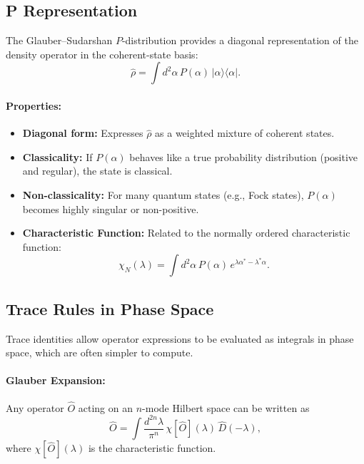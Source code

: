 \subsection{P Representation}

The Glauber--Sudarshan $P$-distribution provides a diagonal representation of the density operator in the coherent-state basis:
\begin{equation}
\hat{\rho} = \int d^2\alpha \, P(\alpha)\, |\alpha\rangle \langle \alpha|.
\end{equation}

\paragraph{Properties:}
\begin{itemize}
    \item \textbf{Diagonal form:} Expresses $\hat{\rho}$ as a weighted mixture of coherent states.
    \item \textbf{Classicality:} If $P(\alpha)$ behaves like a true probability distribution (positive and regular), the state is classical.
    \item \textbf{Non-classicality:} For many quantum states (e.g., Fock states), $P(\alpha)$ becomes highly singular or non-positive.
    \item \textbf{Characteristic Function:} Related to the normally ordered characteristic function:
    \begin{equation}
    \chi_N(\lambda) = \int d^2\alpha \, P(\alpha)\, e^{\lambda \alpha^* - \lambda^* \alpha}.
    \end{equation}
\end{itemize}


\subsection{Trace Rules in Phase Space}

Trace identities allow operator expressions to be evaluated as integrals in phase space, which are often simpler to compute.

\paragraph{Glauber Expansion:}
Any operator $\hat{O}$ acting on an $n$-mode Hilbert space can be written as
\begin{equation}
\hat{O} = \int \frac{d^{2n}\lambda}{\pi^n} \,
\chi[\hat{O}](\lambda)\, \hat{D}(-\lambda),
\end{equation}
where $\chi[\hat{O}](\lambda)$ is the characteristic function.

